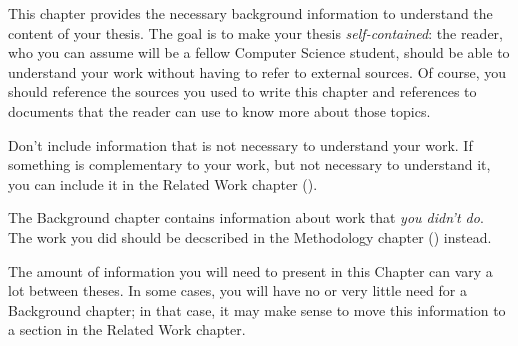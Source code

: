 This chapter provides the necessary background information to understand
the content of your thesis. The goal is to make your thesis
\emph{self-contained}: the reader, who you can assume will be a fellow
Computer Science student, should be able to understand your work without
having to refer to external sources. Of course, you should reference the
sources you used to write this chapter and references to documents that
the reader can use to know more about those topics.

Don't include information that is not necessary to understand your work.
If something is complementary to your work, but not necessary to
understand it, you can include it in the Related Work chapter
().

The Background chapter contains information about work that
\emph{you didn't do}. The work you did should be decscribed in the
Methodology chapter () instead.

The amount of information you will need to present in this Chapter can
vary a lot between theses. In some cases, you will have no or very
little need for a Background chapter; in that case, it may make sense to
move this information to a section in the Related Work chapter.
